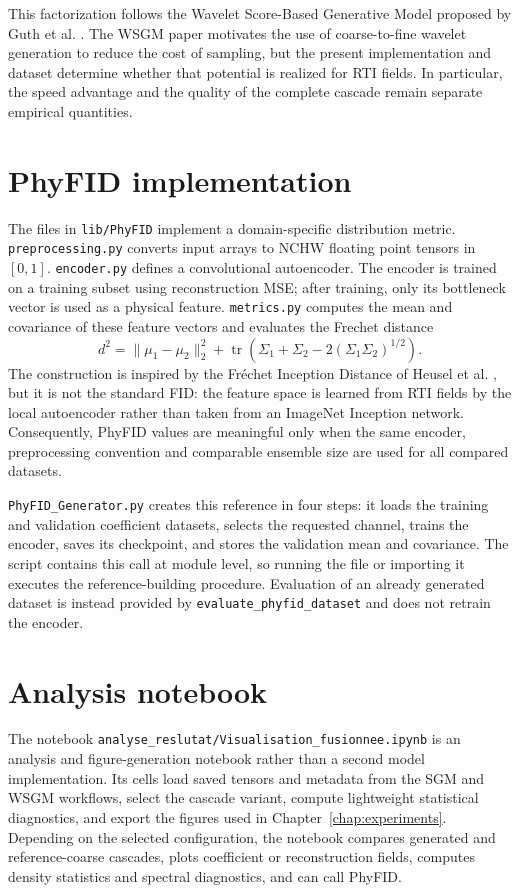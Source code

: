 This factorization follows the Wavelet Score-Based Generative Model proposed
by Guth et al. \citep{Guth2022WSGM}. The WSGM paper motivates the use of
coarse-to-fine wavelet generation to reduce the cost of sampling, but the
present implementation and dataset determine whether that potential is
realized for RTI fields. In particular, the speed advantage and the quality of
the complete cascade remain separate empirical quantities.

\section{PhyFID implementation}

The files in \lstinline|lib/PhyFID| implement a domain-specific distribution
metric. \lstinline|preprocessing.py| converts input arrays to NCHW floating
point tensors in $[0,1]$. \lstinline|encoder.py| defines a convolutional
autoencoder. The encoder is trained on a training subset using reconstruction
MSE; after training, only its bottleneck vector is used as a physical feature.
\lstinline|metrics.py| computes the mean and covariance of these feature
vectors and evaluates the Frechet distance
\[
    d^2 = \lVert\mu_1-\mu_2\rVert_2^2
    + \operatorname{tr}\left(\Sigma_1+\Sigma_2
    -2(\Sigma_1\Sigma_2)^{1/2}\right).
\]
The construction is inspired by the Fréchet Inception Distance of Heusel et
al. \citep{heusel2017fid}, but it is not the standard FID: the feature space is
learned from RTI fields by the local autoencoder rather than taken from an
ImageNet Inception network. Consequently, PhyFID values are meaningful only
when the same encoder, preprocessing convention and comparable ensemble size
are used for all compared datasets.

\lstinline|PhyFID_Generator.py| creates this reference in four steps: it loads
the training and validation coefficient datasets, selects the requested
channel, trains the encoder, saves its checkpoint, and stores the validation
mean and covariance. The script contains this call at module level, so running
the file or importing it executes the reference-building procedure. Evaluation
of an already generated dataset is instead provided by
\lstinline|evaluate_phyfid_dataset| and does not retrain the encoder.

\section{Analysis notebook}

The notebook \lstinline|analyse_reslutat/Visualisation_fusionnee.ipynb| is an
analysis and figure-generation notebook rather than a second model implementation. Its
cells load saved tensors and metadata from the SGM and WSGM workflows, select
the cascade variant, compute lightweight statistical diagnostics, and export
the figures used in Chapter~\ref{chap:experiments}. Depending on the selected
configuration, the notebook compares generated and reference-coarse cascades,
plots coefficient or reconstruction fields, computes density statistics and
spectral diagnostics, and can call PhyFID.

